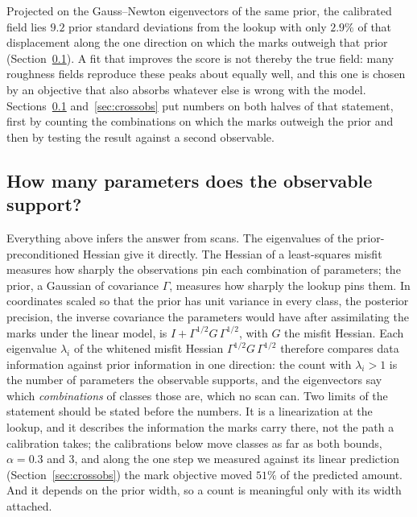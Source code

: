 \documentclass[11pt]{article}
\begin{document}
Projected on the Gauss--Newton eigenvectors of the same prior, the
calibrated field lies $9.2$ prior standard deviations from the lookup
with only $2.9\%$ of that displacement along the one direction on which
the marks outweigh that prior (Section~\ref{sec:spectrum}). A fit that improves the score
is not thereby the true field: many roughness fields reproduce these
peaks about equally well, and this one is chosen by an objective that
also absorbs whatever else is wrong with the model.
Sections~\ref{sec:spectrum} and~\ref{sec:crossobs} put numbers on both
halves of that statement, first by counting the combinations on which
the marks outweigh the prior and then by testing the result against a
second observable.

\subsection{How many parameters does the observable support?}
\label{sec:spectrum}

Everything above infers the answer from scans. The eigenvalues of the
prior-preconditioned Hessian give it directly. The Hessian of a
least-squares misfit measures how sharply the observations pin each
combination of parameters; the prior, a Gaussian of covariance
$\Gamma$, measures how sharply the lookup pins them. In coordinates
scaled so that the prior has unit variance in every class, the
posterior precision, the inverse covariance the parameters would have
after assimilating the marks under the linear model, is
$I + \Gamma^{1/2} G\,\Gamma^{1/2}$, with $G$ the misfit Hessian. Each
eigenvalue $\lambda_i$ of the whitened misfit Hessian
$\Gamma^{1/2} G\,\Gamma^{1/2}$ therefore compares data information
against prior information in one direction: the count with
$\lambda_i > 1$ is the number of parameters the observable supports,
and the eigenvectors say which \emph{combinations} of classes those
are, which no scan can. Two
limits of the statement should be stated before the numbers. It is a
linearization at the lookup, and it describes the information the
marks carry there, not the path a calibration takes; the calibrations
below move classes as far as both bounds, $\alpha = 0.3$ and $3$, and
along the one step we measured against its linear prediction
(Section~\ref{sec:crossobs}) the mark objective moved $51\%$ of the
predicted amount. And it depends on
the prior width, so a count is meaningful only with its width
attached.
\end{document}
